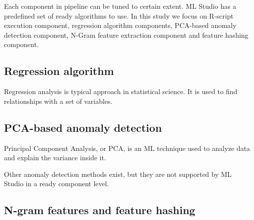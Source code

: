 Each component in pipeline can be tuned
to certain extent.
ML Studio has a predefined set of ready algorithms to use.
In this study we focus on  %
R-script execution component,
regression algorithm components,
PCA-based anomaly detection component,
N-Gram feature extraction component and
feature hashing component.



\subsection{Regression algorithm}\label{subsec:bg-regression-ml}
Regression analysis is typical approach in statistical science.
It is used to find relationships with a set of variables.


\subsection{PCA-based anomaly detection}\label{subsec:bg-pca-ada}



Principal Component Analysis, or PCA,
is an ML technique used to analyze data and explain the variance inside it.

Other anomaly detection methods exist, but they are not supported by ML Studio
in a ready component level. %



\subsection{N-gram features and feature hashing}\label{subsec:bg-ngram-features}

